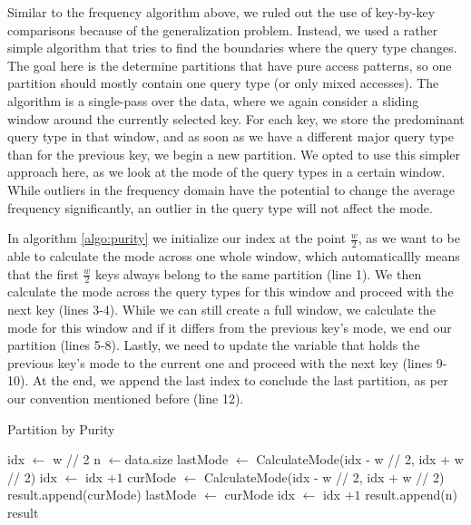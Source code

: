 Similar to the frequency algorithm above, we ruled out the use of key-by-key comparisons because of the generalization problem. Instead, we used a rather simple algorithm that tries to find the boundaries where the query type changes. The goal here is the determine partitions that have pure access patterns, so one partition should mostly contain one query type (or only mixed accesses). The algorithm is a single-pass over the data, where we again consider a sliding window around the currently selected key. For each key, we store the predominant query type in that window, and as soon as we have a different major query type than for the previous key, we begin a new partition. We opted to use this simpler approach here, as we look at the mode of the query types in a certain window. While outliers in the frequency domain have the potential to change the average frequency significantly, an outlier in the query type will not affect the mode. 

In algorithm \ref{algo:purity} we initialize our index at the point $\frac{w}{2}$, as we want to be able to calculate the mode across one whole window, which automaticallly means that the first $\frac{w}{2}$ keys always belong to the same partition (line 1). We then calculate the mode across the query types for this window and proceed with the next key (lines 3-4). While we can still create a full window, we calculate the mode for this window and if it differs from the previous key's mode, we end our partition (lines 5-8). Lastly, we need to update the variable that holds the previous key's mode to the current one and proceed with the next key (lines 9-10). At the end, we append the last index to conclude the last partition, as per our convention mentioned before (line 12).

\begin{algorithm}
\caption{Partition by Purity}
\begin{algorithmic}[1]\label{algo:purity}
    \STATE idx $\leftarrow$ w // 2
    \STATE n $\leftarrow $data.size
    \STATE lastMode $\leftarrow$ CalculateMode(idx - w // 2, idx + w // 2)
    \STATE idx $\leftarrow$ idx $+ 1$
        \STATE curMode $\leftarrow$ CalculateMode(idx - w // 2, idx + w // 2)
            \STATE result.append(curMode)
        \ENDIF
        \STATE lastMode $\leftarrow$ curMode
        \STATE idx $\leftarrow$ idx $+ 1$
    \ENDWHILE
    \STATE result.append(n)
    \RETURN result
\end{algorithmic}
\end{algorithm}

